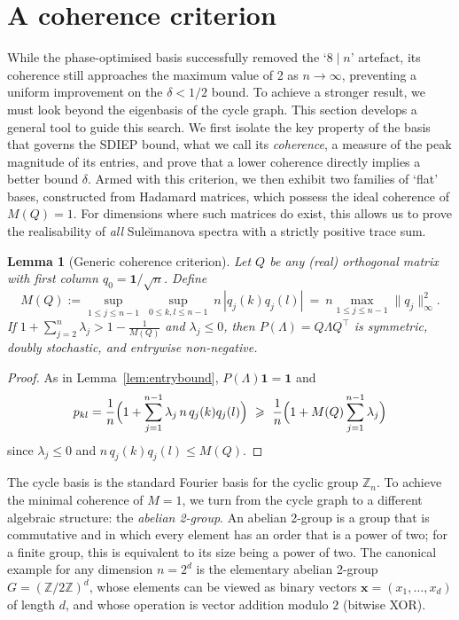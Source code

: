 \documentclass[12pt,fleqn]{amsart}
\renewcommand{\le}{\leqslant}
\renewcommand{\ge}{\geqslant}
\newtheorem{lem}[thm]{Lemma}
\theoremstyle{remark}
\newcommand{\1}{\mathbf{1}}
\newcommand{\Lam}{\Lambda}
\begin{document}
\section{A coherence criterion}\label{sec:coherence}

While the phase-optimised basis successfully removed the `$8 \mid n$' artefact, its coherence still approaches the maximum value of 2 as $n \to \infty$, preventing a uniform improvement on the $\delta < 1/2$ bound. To achieve a stronger result, we must look beyond the eigenbasis of the cycle graph. This section develops a general tool to guide this search. We first isolate the key property of the basis that governs the SDIEP bound, what we call its \emph{coherence}, a measure of the peak magnitude of its entries, and prove that a lower coherence directly implies a better bound $\delta$. Armed with this criterion, we then exhibit two families of `flat' bases, constructed from Hadamard matrices, which possess the ideal coherence of $M(Q)=1$. For dimensions where such matrices do exist, this allows us to prove the realisability of \emph{all} Sule\u{\i}manova spectra with a strictly positive trace sum.

\begin{lem}[Generic coherence criterion]\label{lem:coh}
Let $Q$ be any (real) orthogonal matrix with first column $q_0=\1/\sqrt n$. Define
\[
M(Q):=\sup_{1\le j\le n-1}\ \sup_{0\le k,l\le n-1}\ n\,|q_j(k)q_j(l)|
\ =\ n\max_{1\le j\le n-1}\|q_j\|_\infty^2.
\]
If $1+\sum_{j=2}^n\lambda_j>1-\tfrac1{M(Q)}$ and $\lambda_j\le0$, then $P(\Lam)=Q\Lam Q^\top$ is \emph{symmetric, doubly stochastic, and entrywise non-negative}.
\end{lem}


\begin{proof}
As in Lemma~\ref{lem:entrybound}, $P(\Lam)\1=\1$ and
\[
p_{kl}=\frac1n\Bigl(1+\sum_{j=1}^{n-1}\lambda_j\,n\,q_j(k)q_j(l)\Bigr)
\ \ge\ \frac1n\Bigl(1+M(Q)\sum_{j=1}^{n-1}\lambda_j\Bigr)
\]
since $\lambda_j\le0$ and $n\,q_j(k)q_j(l)\le M(Q)$.
\end{proof}

The cycle basis is the standard Fourier basis for the cyclic group $\mathbb{Z}_n$. To achieve the minimal coherence of $M=1$, we turn from the cycle graph to a different algebraic structure: the \emph{abelian 2-group}. An abelian 2-group is a group that is commutative and in which every element has an order that is a power of two; for a finite group, this is equivalent to its size being a power of two. The canonical example for any dimension $n=2^d$ is the elementary abelian 2-group $G = (\mathbb{Z}/2\mathbb{Z})^d$, whose elements can be viewed as binary vectors $\mathbf{x}=(x_1, \dots, x_d)$ of length $d$, and whose operation is vector addition modulo $2$ (bitwise XOR).
\end{document}
